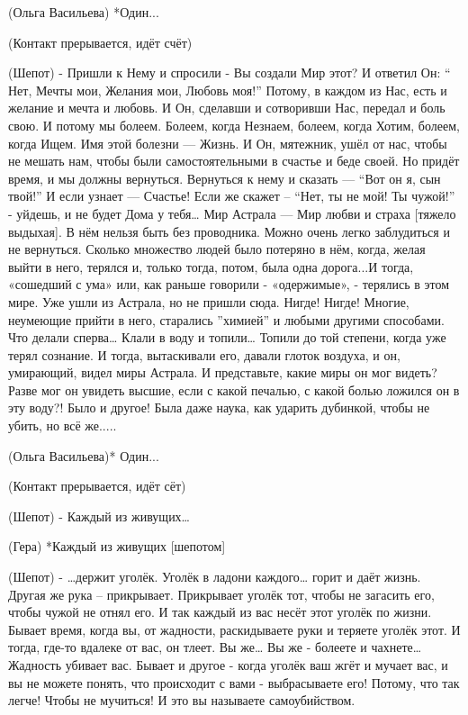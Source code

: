 (Ольга Васильева) *Один... 

(Контакт прерывается, идёт счёт)


(Шепот) -  Пришли к Нему и спросили - Вы создали Мир этот? И ответил Он: “ Нет, Мечты мои, Желания мои, Любовь моя!” Потому, в каждом из Нас, есть и желание и мечта и любовь. И Он, сделавши и сотворивши Нас, передал и боль свою. И потому мы болеем. Болеем, когда Незнаем, болеем, когда Хотим, болеем, когда Ищем. Имя этой болезни — Жизнь. И Он, мятежник, ушёл от нас, чтобы не мешать нам, чтобы были самостоятельными в счастье и беде своей. Но придёт время, и мы должны вернуться. Вернуться к нему и сказать — “Вот он я, сын твой!” И если узнает — Счастье! Если же скажет – “Нет, ты не мой! Ты чужой!” - уйдешь, и не будет Дома у тебя…  Мир Астрала — Мир любви и страха [тяжело выдыхая]. В нём нельзя быть без проводника. Можно очень легко заблудиться и не вернуться. Сколько множество людей было потеряно в нём, когда, желая выйти в него, терялся и, только тогда, потом, была одна дорога...И тогда, «сошедший с ума» или, как раньше говорили - «одержимые», - терялись в этом мире. Уже ушли из Астрала, но не пришли сюда. Нигде! Нигде! Многие, неумеющие прийти в него, старались ”химией” и любыми другими способами. Что делали сперва… Клали в воду и  топили… Топили до той степени, когда уже терял сознание. И тогда, вытаскивали его,  давали глоток воздуха, и он, умирающий, видел миры Астрала. И представьте, какие миры он мог видеть? Разве мог он увидеть высшие, если с какой печалью, с какой болью ложился он в эту воду?! Было и другое! Была даже наука, как ударить дубинкой, чтобы не убить, но всё же.....

(Ольга Васильева)* Один...

(Контакт прерывается, идёт сёт)


(Шепот) - Каждый из живущих…

(Гера) *Каждый из живущих [шепотом]

(Шепот)  - …держит уголёк. Уголёк в ладони каждого… горит и даёт жизнь. Другая же рука – прикрывает. Прикрывает уголёк тот, чтобы не загасить его, чтобы чужой не отнял его. И так  каждый из вас несёт этот уголёк по жизни. Бывает время, когда вы, от жадности, раскидываете руки и теряете уголёк этот. И тогда, где-то вдалеке от вас, он тлеет.  Вы же… Вы же - болеете и чахнете… Жадность убивает вас. Бывает и другое - когда уголёк ваш жгёт и мучает вас, и вы не можете понять, что происходит с вами - выбрасываете его! Потому, что так легче! Чтобы не мучиться! И это вы называете самоубийством. 

